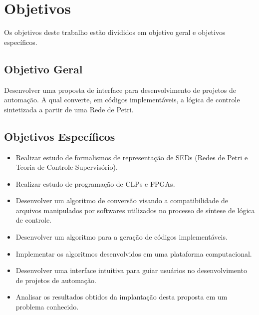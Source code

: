 
\chapter{Objetivos}

Os objetivos deste trabalho est\~ao divididos em objetivo geral e objetivos espec\'ificos.

\section{Objetivo Geral}

Desenvolver uma proposta de interface para desenvolvimento de projetos de automa\c{c}\~ao. A qual converte, em c\'odigos implement\'aveis, a l\'ogica de controle sintetizada a partir de uma Rede de Petri.

\section{Objetivos Espec\'ificos}

\begin{itemize}
	\item Realizar estudo de formalismos de representa\c{c}\~ao de SEDs (Redes de Petri e Teoria de Controle Supervis\'orio).
	
	\item Realizar estudo de programa\c{c}\~ao de CLPs e FPGAs.
	
	\item Desenvolver um algoritmo de convers\~ao visando a compatibilidade de arquivos manipulados por softwares utilizados no processo de s\'intese de l\'ogica de controle.
	
	\item Desenvolver um algoritmo para a gera\c{c}\~ao de c\'odigos implement\'aveis.
	
	\item Implementar os algoritmos desenvolvidos em uma plataforma computacional.
	
	\item Desenvolver uma interface intuitiva para guiar usu\'arios no desenvolvimento de projetos de automa\c{c}\~ao.
	
	\item Analisar os resultados obtidos da implanta\c{c}\~ao desta proposta em um problema conhecido.
\end{itemize} 